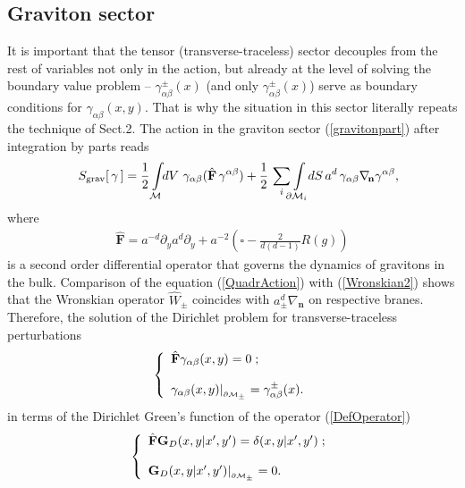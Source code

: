 \documentclass[a4paper,12pt]{article}
\newcommand{\za}{{\alpha}}   %
\newcommand{\zb}{{\beta}}    %
\newcommand{\ddim}{{d}}
\newcommand{\M}{{\cal M}}
\newcommand{\dM}{{\partial \cal M}}
\newcommand{\un}{\mathbf n} %
\newcommand{\ddy}{{\partial_y}}
\newcommand{\bBox}{\square}  %
\newcommand{\BBox}{\hat{\mathbf{F}}}  %
\newcommand{\Bnabla}{\nabla}  %
\newcommand{\Bnablan}{\nabla_{\un}}
\newcommand{\GrD}{ \mathbf{G}_{D}}  %
\newcommand{\dV}{dV\,}
\newcommand{\dS}{dS}
\begin{document}
\subsection{Graviton sector}
\hspace{\parindent}It is important that the tensor
(transverse-traceless) sector decouples from the rest of variables
not only in the action, but already at the level of solving the
boundary value problem -- $\gamma_{\alpha\beta}^\pm(x)$ (and only
$\gamma_{\alpha\beta}^\pm(x)$) serve as boundary conditions for
$\gamma_{\alpha\beta}(x,y)$. That is why the situation in this
sector literally repeats the technique of Sect.2. The action in
the graviton sector (\ref{gravitonpart}) after integration by
parts reads
   \begin{eqnarray}
     &&S_{\mathrm{grav}}[\,\gamma\,]=
    \frac12 \int\limits_{\M}\!\!\dV\,
     \gamma_{\za\zb}(\BBox\,
    \gamma^{\za\zb})+\frac12\,\sum_i\!\!\int
     \limits_{\dM_i}\!\!\dS\,a^\ddim\,
     \gamma_{\za\zb}
    \Bnabla_{\!\un}\gamma^{\za\zb},        \label{QuadrAction}
    \end{eqnarray}
where
    \begin{eqnarray}
     \BBox=a^{-\ddim}\ddy a^{\ddim}\ddy +
     a^{-2}\left(\bBox
    -\frac2{\ddim(\ddim-1)}R(g)\right)     \label{DefOperator}
    \end{eqnarray}
is a second order differential operator that governs the dynamics
of gravitons in the bulk. Comparison of the equation
(\ref{QuadrAction}) with (\ref{Wronskian2}) shows that the
Wronskian operator $\hat W_\pm$ coincides with $a^d_\pm\Bnablan$
on respective branes. Therefore, the solution of the Dirichlet
problem for transverse-traceless perturbations
    \begin{eqnarray}
     \left\{ \begin{array}{l}
     \BBox \gamma_{\za\zb}(x,y)=0\;; \\
     \\
     \gamma_{\za\zb} (x,y)|_{_{\dM_\pm}}
     =\gamma^\pm_{\za\zb}(x).
     \end{array} \right.                  \label{Dbvp for grav}
    \end{eqnarray}
in terms of the Dirichlet Green's function of the operator
(\ref{DefOperator})
    \begin{eqnarray}
     \left\{ \begin{array}{l}
     \BBox \GrD(x,y|x',y')=\delta(x,y|x',y')\;; \\
    \\
     \GrD(x,y|x',y')|_{_{\dM_\pm}}=0.
     \end{array} \right.                       \label{Dbvp for GF}
    \end{eqnarray}
\end{document}
